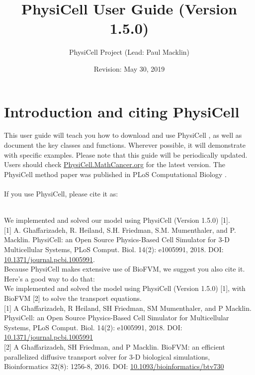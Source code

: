 \documentclass[12pt]{article}
\newcommand{\Version}{1.5.0}
\newcommand{\ReleaseDate}{May 30, 2019}
\newcommand{\blue}[1]{\textcolor{blue}{#1}}
\newcommand{\DONE}{}%
\begin{document}
\author{PhysiCell Project (Lead: Paul Macklin)}
\title{PhysiCell User Guide (Version \Version)}
\date{Revision: \ReleaseDate}%

\maketitle

\setlength{\parskip}{0in}
\hypertarget{TOC}{}
\tableofcontents
\setlength{\parskip}{8pt}

\section{Introduction and citing PhysiCell \DONE}
This user guide will teach you how to download and use PhysiCell \cite{ref:PhysiCell}, 
as well as document the key classes and functions. Wherever possible, it will demonstrate 
with specific examples. Please note that this guide will be periodically updated. Users 
should check \href{http://PhysiCell.MathCancer.org}{PhysiCell.MathCancer.org} for the latest version. 
The PhysiCell method paper was published in PLoS Computational Biology \cite{ref:PhysiCell}. \\
\\
If you use PhysiCell, please cite it as: \\
\\
\phantom{ }\hspace{.075\textwidth}\parbox[top]{0.85\textwidth}{%
We implemented and solved our model using PhysiCell (Version \Version) [1]. \\

[1] A. Ghaffarizadeh, R. Heiland, S.H. Friedman, S.M. Mumenthaler, and P. Macklin. PhysiCell: an Open Source Physics-Based Cell Simulator for 3-D Multicellular Systems, PLoS Comput. Biol. 14(2): e1005991, 2018. DOI: \href{https://dx.doi.org/10.1371/journal.pcbi.1005991}{10.1371/journal.pcbi.1005991}. \\

Because PhysiCell makes extensive use of BioFVM, we suggest you also cite it. Here's a good way to do that:  \\

We implemented and solved the model using PhysiCell (Version \Version) [1], with BioFVM [2] to solve the transport equations. \\

[1] A Ghaffarizadeh, R Heiland, SH Friedman, SM Mumenthaler, and P Macklin. PhysiCell: an Open Source Physics-Based Cell Simulator for Multicellular Systems, PLoS Comput. Biol. 14(2): e1005991, 2018. DOI: \href{https://dx.doi.org/10.1371/journal.pcbi.1005991}{10.1371/journal.pcbi.1005991} \\

[2] A Ghaffarizadeh, SH Friedman, and P Macklin. BioFVM: an efficient parallelized diffusive transport solver for 3-D biological simulations, Bioinformatics 32(8): 1256-8, 2016. DOI: \href{https://dx.doi.org/10.1093/bioinformatics/btv730}{10.1093/bioinformatics/btv730}  
}
\end{document}
